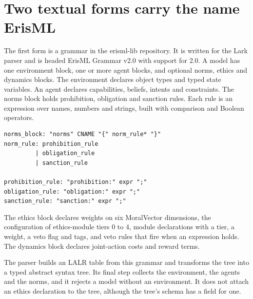 \section{Two textual forms carry the name ErisML}\label{sec:erisml-two-forms}

The first form is a grammar in the erisml-lib repository. It is written for the Lark parser and is
headed ErisML Grammar v2.0 with support for \deme{} 2.0. A model has one environment block, one or
more agent blocks, and optional norms, ethics and dynamics blocks. The environment declares object
types and typed state variables. An agent declares capabilities, beliefs, intents and constraints.
The norms block holds prohibition, obligation and sanction rules. Each rule is an expression over
names, numbers and strings, built with comparison and Boolean operators.

\noindent\begin{minipage}{\linewidth}
\begin{lstlisting}[caption={The norms block of the erisml-lib grammar}, label={lst:lark-norms}]
norms_block: "norms" CNAME "{" norm_rule* "}"
norm_rule: prohibition_rule
         | obligation_rule
         | sanction_rule

prohibition_rule: "prohibition:" expr ";"
obligation_rule: "obligation:" expr ";"
sanction_rule: "sanction:" expr ";"
\end{lstlisting}
\end{minipage}

The ethics block declares weights on six MoralVector dimensions, the configuration of ethics-module
tiers 0 to 4, module declarations with a tier, a weight, a veto flag and tags, and veto rules that
fire when an expression holds. The dynamics block declares joint-action costs and reward terms.

The parser builds an LALR table from this grammar and transforms the tree into a typed abstract
syntax tree. Its final step collects the environment, the agents and the norms, and it rejects a
model without an environment. It does not attach an ethics declaration to the tree, although the
tree's schema has a field for one.

